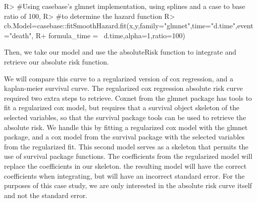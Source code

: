 \documentclass[
]{jss}
\begin{document}
\begin{CodeChunk}

\begin{CodeInput}
R> #Using casebase's glmnet implementation, using splines and a case to base ratio of 100,
R> #to determine the hazard function
R> cb.Model=casebase::fitSmoothHazard.fit(x,y,family="glmnet",time="d.time",event="death",
R+                              formula_time = ~d.time,alpha=1,ratio=100)
\end{CodeInput}
\end{CodeChunk}

Then, we take our model and use the absoluteRisk function to integrate
and retrieve our absolute risk function.

\begin{CodeChunk}

\end{CodeChunk}

We will compare this curve to a regularized version of cox regression,
and a kaplan-meier survival curve. The regularized cox regression
absolute risk curve required two extra steps to retrieve. Coxnet from
the glmnet package has tools to fit a regularized cox model, but
requires that a survival object skeleton of the selected variables, so
that the survival package tools can be used to retrieve the absolute
risk. We handle this by fitting a regularized cox model with the glmnet
package, and a cox model from the survival package with the selected
variables from the regularized fit. This second model serves as a
skeleton that permits the use of survival package functions. The
coefficients from the regularized model will replace the coefficients in
our skeleton. the resulting model will have the correct coefficients
when integrating, but will have an incorrect standard error. For the
purposes of this case study, we are only interested in the absolute risk
curve itself and not the standard error.
\end{document}
